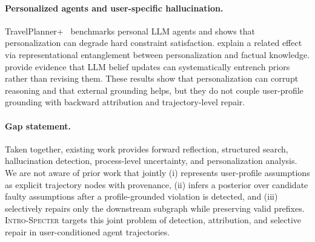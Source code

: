 \paragraph{Personalized agents and user-specific hallucination.}
TravelPlanner+~\citep{singh2024travelplanner} benchmarks personal LLM agents
and shows that personalization can degrade hard constraint satisfaction.
\citet{sun2026personalization} explain a related effect via representational
entanglement between personalization and factual knowledge.
\citet{he2025martingale} provide evidence that LLM belief updates can
systematically entrench priors rather than revising them. These results show
that personalization can corrupt reasoning and that external grounding helps,
but they do not couple user-profile grounding with backward attribution and
trajectory-level repair.

\paragraph{Gap statement.}
Taken together, existing work provides forward reflection, structured search,
hallucination detection, process-level uncertainty, and personalization
analysis. We are not aware of prior work that jointly (i) represents
user-profile assumptions as explicit trajectory nodes with provenance,
(ii) infers a posterior over candidate faulty assumptions after a
profile-grounded violation is detected, and (iii) selectively repairs only
the downstream subgraph while preserving valid prefixes.
\textsc{Intro-Specter} targets this joint problem of detection, attribution,
and selective repair in user-conditioned agent trajectories.

